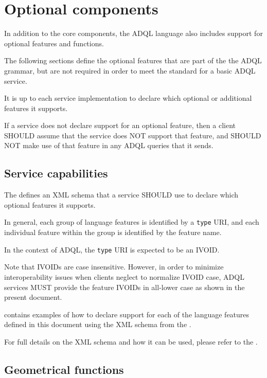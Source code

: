 \documentclass[11pt,a4paper]{ivoa}
\begin{document}
\clearpage %
\section{Optional components}
\label{sec:optional}

In addition to the core components, the ADQL language also includes support
for optional features and functions.

The following sections define the optional features that are part of the
the ADQL grammar, but are not required in order to meet the standard for
a basic ADQL service.

It is up to each service implementation to declare which optional or
additional features it supports.

If a service does not declare support for an optional feature,
then a client SHOULD assume that the service does NOT support
that feature, and SHOULD NOT make use of that feature in any
ADQL queries that it sends.

\subsection{Service capabilities}
\label{sec:capabilities}

The \TAPRegSpec{} defines an XML schema that a service SHOULD
use to declare which optional features it supports.

In general, each group of language features is identified by a \verb:type:
URI, and each individual feature within the group is identified by the
feature name.

In the context of ADQL, the \verb:type: URI is expected to be an IVOID.

Note that IVOIDs are case insensitive. However, in order to minimize
interoperability issues when clients neglect to normalize IVOID case,
ADQL services MUST provide the feature IVOIDs in all-lower case as shown
in the present document.

 contains examples of how to declare support
for each of the language features defined in this document using the
XML schema from the \TAPRegSpec{}.

For full details on the XML schema and how it can be used, please refer to
the \TAPRegSpec{}.

\subsection{Geometrical functions}
\label{sec:functions.geom}
\end{document}
